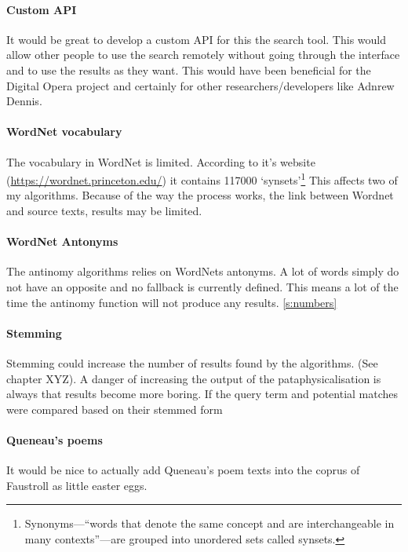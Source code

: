 \paragraph{Custom API}
It would be great to develop a custom \ac{API} for this the search tool. This would allow other people to use the search remotely without going through the interface and to use the results as they want. This would have been beneficial for the Digital Opera project and certainly for other researchers/developers like Adnrew Dennis.

\paragraph{WordNet vocabulary}
The vocabulary in WordNet is limited. According to it's website (\url{https://wordnet.princeton.edu/}) it contains \num{117000} `synsets'\footnote{Synonyms---``words that denote the same concept and are interchangeable in many contexts''---are grouped into unordered sets called synsets.} This affects two of my algorithms. Because of the way the process works, the link between Wordnet and source texts, results may be limited.

\paragraph{WordNet Antonyms}
The antinomy algorithms relies on WordNets antonyms. A lot of words simply do not have an opposite and no fallback is currently defined. This means a lot of the time the antinomy function will not produce any results.
\ref{s:numbers}

\paragraph{Stemming}
Stemming could increase the number of results found by the algorithms. (See chapter XYZ). A danger of increasing the output of the pataphysicalisation is always that results become more boring. If the query term and potential matches were compared based on their stemmed form 
 
\paragraph{Queneau's poems}
It would be nice to actually add Queneau's poem texts into the coprus of Faustroll as little easter eggs.

